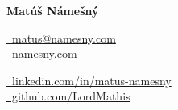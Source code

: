 \documentclass[a4paper,12pt]{article}
\begin{document}
\begin{center}
{\Huge\bfseries\filcenter Matúš Námešný}
\end{center}

\begin{center}
\begin{minipage}{0.45\textwidth}
  \begin{flushleft}
    \href{mailto:matus@namesny.com}{\faEnvelope\ matus@namesny.com} \\[6pt]
    \href{https://namesny.com}{\faGlobe\ namesny.com}
  \end{flushleft}
\end{minipage}
\hfill
\begin{minipage}{0.45\textwidth}
  \begin{flushleft}
    \href{https://www.linkedin.com/in/matus-namesny/}{\faLinkedin\ linkedin.com/in/matus-namesny} \\[6pt]
    \href{https://www.github.com/LordMathis}{\faGithub\ github.com/LordMathis}
  \end{flushleft}
\end{minipage}
\end{center}
\end{document}
